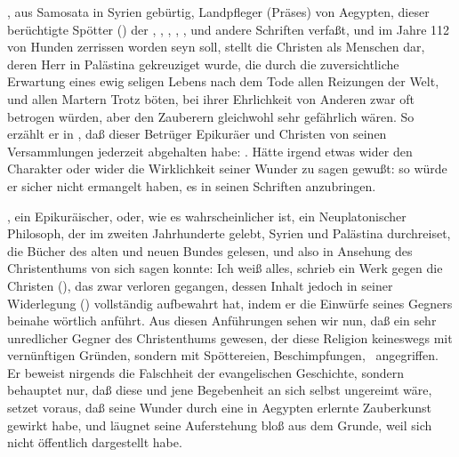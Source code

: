 \begin{aufza}
\begin{aufzb}
\item {}, aus Samosata in Syrien gebürtig, Landpfleger (Präses) von Aegypten, dieser berüchtigte Spötter () der , , , , , und andere Schriften verfaßt, und im Jahre 112 von Hunden zerrissen worden seyn soll, stellt die Christen als Menschen dar, deren Herr in Palästina gekreuziget wurde, die durch die zuversichtliche Erwartung eines ewig seligen Lebens nach dem Tode allen Reizungen der Welt, und allen Martern Trotz böten, bei ihrer Ehrlichkeit von Anderen zwar oft betrogen würden, aber den Zauberern gleichwohl sehr gefährlich wären. So erzählt er in , daß dieser Betrüger Epikuräer und Christen von seinen Versammlungen jederzeit abgehalten habe: . Hätte  irgend etwas wider den Charakter  oder wider die Wirklichkeit seiner Wunder zu sagen gewußt: so würde er sicher nicht ermangelt haben, es in seinen Schriften anzubringen.
\item {}, ein Epikuräischer, oder, wie es wahrscheinlicher ist, ein Neuplatonischer Philosoph, der im zweiten Jahrhunderte gelebt, Syrien und Palästina durchreiset, die Bücher des alten und neuen Bundes gelesen, und also in Ansehung des Christenthums von sich sagen konnte: Ich weiß alles, schrieb ein Werk gegen die Christen (), das zwar verloren gegangen, dessen Inhalt jedoch  in seiner Widerlegung () vollständig aufbewahrt hat, indem er die Einwürfe seines Gegners beinahe wörtlich anführt. Aus diesen Anführungen sehen wir nun, daß  ein sehr unredlicher Gegner des Christenthums gewesen, der diese Religion keineswegs mit vernünftigen Gründen, sondern mit Spöttereien, Beschimpfungen, \udgl\  angegriffen. Er beweist nirgends die Falschheit der evangelischen Geschichte, sondern behauptet nur, daß diese und jene Begebenheit an sich selbst ungereimt wäre, setzet voraus, daß  seine Wunder durch eine in Aegypten erlernte Zauberkunst gewirkt habe, und läugnet seine Auferstehung bloß aus dem Grunde, weil  sich nicht öffentlich dargestellt habe.

\end{aufzb}
\end{aufza}
